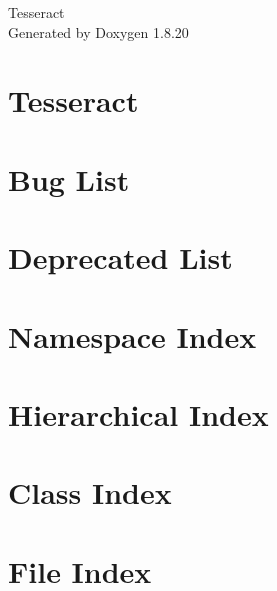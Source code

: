 \let\mypdfximage\pdfximage\def\pdfximage{\immediate\mypdfximage}\documentclass[twoside]{book}
\newcommand{\+}{\discretionary{\mbox{\scriptsize$\hookleftarrow$}}{}{}}
\newcommand{\clearemptydoublepage}{%
  \newpage{\pagestyle{empty}\cleardoublepage}%
}
\begin{document}
\hypersetup{pageanchor=false,
             bookmarksnumbered=true,
             pdfencoding=unicode
            }
\begin{titlepage}
\vspace*{7cm}
\begin{center}%
{\Large Tesseract }\\
\vspace*{1cm}
{\large Generated by Doxygen 1.8.20}\\
\end{center}
\end{titlepage}
\clearemptydoublepage
{}
\tableofcontents
\clearemptydoublepage
{}
\hypersetup{pageanchor=true}

\chapter{Tesseract}
\label{index}\hypertarget{index}{}
\chapter{Bug List}
\label{bug}

\chapter{Deprecated List}
\label{deprecated}

\chapter{Namespace Index}

\chapter{Hierarchical Index}

\chapter{Class Index}

\chapter{File Index}

\end{document}
